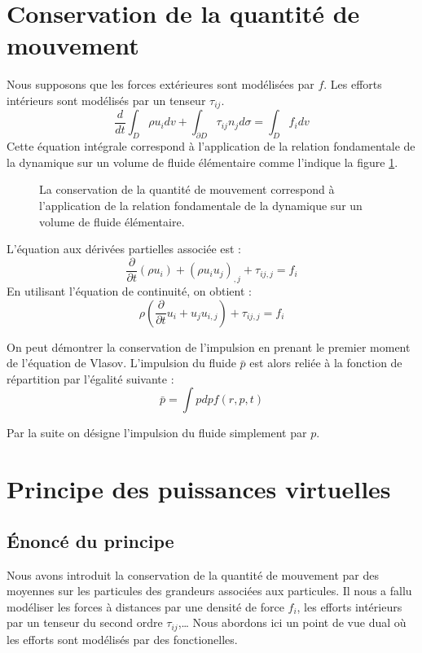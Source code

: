 \documentclass[12pt]{book}
\begin{document}
\section{Conservation de la quantit\'e de mouvement}
Nous supposons que les forces ext\'erieures sont mod\'elis\'ees par
$f$. Les efforts int\'erieurs sont mod\'elis\'es par un tenseur
$\tau_{ij}$.
\begin{equation}
\frac{d}{dt}\int_D \rho u_idv+\int_{\partial D} \tau_{ij}
n_jd\sigma=\int_D f_idv 
\end{equation}
Cette \'equation int\'egrale correspond \`a l'application de la
relation fondamentale de la dynamique sur un volume
de fluide 
\'el\'ementaire comme l'indique la figure \ref{figconsp}.
\begin{figure}[htb]
 \centerline{}   
 \caption{La conservation de la quantit\'e de mouvement correspond \`a
l'application de la relation fondamentale de la dynamique sur un
volume de fluide \'el\'ementaire.}
 \label{figconsp}
\end{figure}
L'\'equation aux d\'eriv\'ees partielles associ\'ee est :
\begin{equation}
\frac{\partial}{\partial t}(\rho u_i)+(\rho u_i u_j)_{,j}+\tau_{ij,j}=f_i
\end{equation}
En utilisant l'\'equation de continuit\'e, on obtient :
\begin{equation}
\rho(\frac{\partial}{\partial t}u_i+u_j u_{i,j})+\tau_{ij,j}=f_i
\end{equation}

\begin{rem}
On peut d\'emontrer la conservation de l'impulsion en prenant le
premier moment de l'\'equation  de Vlasov. L'impulsion du fluide $\bar p$ est
alors 
reli\'ee \`a la fonction de r\'epartition par l'\'egalit\'e suivante :
\begin{equation}
\bar p=\int p dp f(r,p,t)
\end{equation}
\end{rem}
Par la suite on d\'esigne l'impulsion du fluide simplement par $p$.
\section{Principe des puissances virtuelles}\label{secpuisvirtu}
\subsection{\'Enonc\'e du principe}
Nous avons introduit la conservation de la quantit\'e de mouvement par
des moyennes sur les particules des grandeurs associ\'ees aux
particules. Il nous a fallu mod\'eliser les forces \`a distances par
une densit\'e de force $f_i$, les efforts int\'erieurs par un
tenseur du second ordre $\tau_{ij}$,\dots
Nous abordons ici un point de vue dual o\`u les efforts sont
mod\'elis\'es par des fonctionelles.
\end{document}
